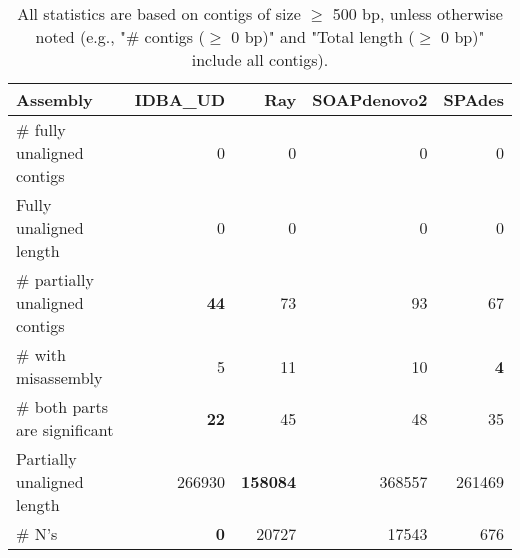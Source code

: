 \documentclass[12pt,a4paper]{article}
\begin{document}
\begin{table}[ht]
\begin{center}
\caption{All statistics are based on contigs of size $\geq$ 500 bp, unless otherwise noted (e.g., "\# contigs ($\geq$ 0 bp)" and "Total length ($\geq$ 0 bp)" include all contigs).}
\begin{tabular}{|l*{4}{|r}|}
\hline
Assembly & IDBA\_UD & Ray & SOAPdenovo2 & SPAdes \\ \hline
\# fully unaligned contigs & 0 & 0 & 0 & 0 \\ \hline
Fully unaligned length & 0 & 0 & 0 & 0 \\ \hline
\# partially unaligned contigs & {\bf 44} & 73 & 93 & 67 \\ \hline
\hspace{5mm}\# with misassembly & 5 & 11 & 10 & {\bf 4} \\ \hline
\hspace{5mm}\# both parts are significant & {\bf 22} & 45 & 48 & 35 \\ \hline
Partially unaligned length & 266930 & {\bf 158084} & 368557 & 261469 \\ \hline
\# N's & {\bf 0} & 20727 & 17543 & 676 \\ \hline
\end{tabular}
\end{center}
\end{table}
\end{document}
